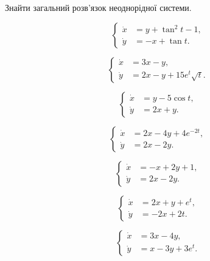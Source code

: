 Знайти загальний розв'язок неоднорідної системи.
\begin{multicols}{2}
	\begin{problem}
		\[ \left\{ \begin{aligned}
			\dot x &= y + \tan^2 t - 1, \\
			\dot y &= - x + \tan t.
		\end{aligned} \right. \]
	\end{problem}

	\begin{problem}
		\[ \left\{ \begin{aligned}
			\dot x &= 3 x - y, \\
			\dot y &= 2 x - y + 15 e^t \sqrt{t}.
		\end{aligned} \right. \]
	\end{problem}

	\begin{problem}
		\[ \left\{ \begin{aligned}
			\dot x &= y - 5 \cos t, \\
			\dot y &= 2 x + y.
		\end{aligned} \right. \]
	\end{problem}
	
	\begin{problem}
		\[ \left\{ \begin{aligned}
			\dot x &= 2 x - 4 y + 4 e^{-2t}, \\
			\dot y &= 2 x - 2 y.
		\end{aligned} \right. \]
	\end{problem}

	\begin{problem}
		\[ \left\{ \begin{aligned}
			\dot x &= - x + 2 y + 1, \\
			\dot y &= 2 x - 2 y.
		\end{aligned} \right. \]
	\end{problem}

	\begin{problem}
		\[ \left\{ \begin{aligned}
			\dot x &= 2 x + y + e^t, \\
			\dot y &= - 2 x + 2 t.
		\end{aligned} \right. \]
	\end{problem}
	
	\begin{problem}
		\[ \left\{ \begin{aligned}
			\dot x &= 3 x - 4 y, \\
			\dot y &= x - 3 y + 3 e^t.
		\end{aligned} \right. \]
	\end{problem}
	

\end{multicols}
